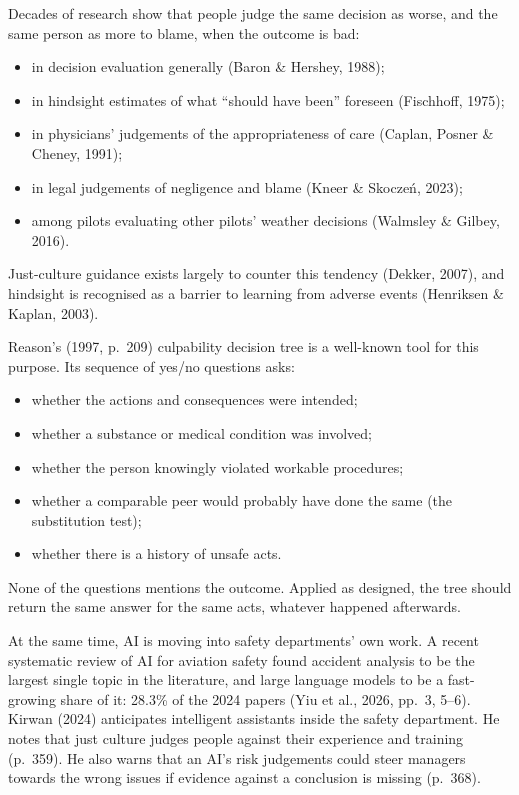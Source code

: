 \documentclass[review,12pt]{elsarticle}
\providecommand{\tightlist}{\setlength{\itemsep}{0pt}\setlength{\parskip}{0pt}}
\begin{document}
Decades of research show that people judge the same decision as worse, and the same person as more to blame, when the outcome is bad:

\begin{itemize}
\tightlist
\item
  in decision evaluation generally (Baron \& Hershey, 1988);
\item
  in hindsight estimates of what ``should have been'' foreseen (Fischhoff, 1975);
\item
  in physicians' judgements of the appropriateness of care (Caplan, Posner \& Cheney, 1991);
\item
  in legal judgements of negligence and blame (Kneer \& Skoczeń, 2023);
\item
  among pilots evaluating other pilots' weather decisions (Walmsley \& Gilbey, 2016).
\end{itemize}

Just-culture guidance exists largely to counter this tendency (Dekker, 2007), and hindsight is recognised as a barrier to learning from adverse events (Henriksen \& Kaplan, 2003).

Reason's (1997, p.~209) culpability decision tree is a well-known tool for this purpose. Its sequence of yes/no questions asks:

\begin{itemize}
\tightlist
\item
  whether the actions and consequences were intended;
\item
  whether a substance or medical condition was involved;
\item
  whether the person knowingly violated workable procedures;
\item
  whether a comparable peer would probably have done the same (the substitution test);
\item
  whether there is a history of unsafe acts.
\end{itemize}

None of the questions mentions the outcome. Applied as designed, the tree should return the same answer for the same acts, whatever happened afterwards.

At the same time, AI is moving into safety departments' own work. A recent systematic review of AI for aviation safety found accident analysis to be the largest single topic in the literature, and large language models to be a fast-growing share of it: 28.3\% of the 2024 papers (Yiu et al., 2026, pp.~3, 5--6). Kirwan (2024) anticipates intelligent assistants inside the safety department. He notes that just culture judges people against their experience and training (p.~359). He also warns that an AI's risk judgements could steer managers towards the wrong issues if evidence against a conclusion is missing (p.~368).
\end{document}
